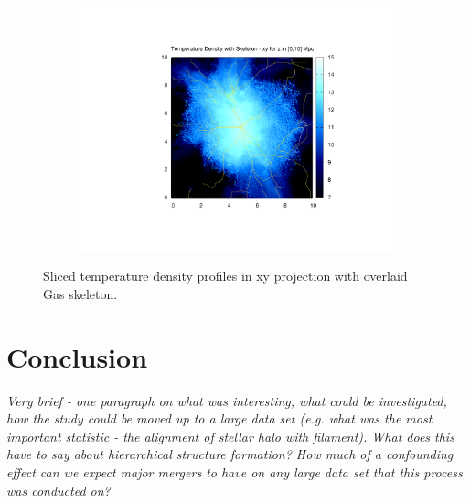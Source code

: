 \documentclass[journal]{IEEEtran}
\begin{document}
\begin{figure}[!t]
\begin{subfigure}[t]{0.3\textwidth}
		\includegraphics[width=\linewidth]{TempDenSkelall.pdf}
	\end{subfigure}
\label{fig:tempskel}
\caption{Sliced temperature density profiles in xy projection with overlaid Gas skeleton.}
\end{figure}

\section{Conclusion}
\textit{Very brief - one paragraph on what was interesting, what could be investigated, how the study could be moved up to a large data set (e.g. what was the most important statistic - the alignment of stellar halo with filament).
What does this have to say about hierarchical structure formation? How much of a confounding effect can we expect major mergers to have on any large data set that this process was conducted on?}


\appendices
\end{document}
